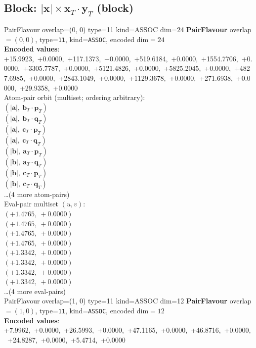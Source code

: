 \documentclass[a4paper,11pt]{article}
\newcommand{\vc}[1]{\ensuremath{\mathbf{#1}}}
\newcommand{\dnfagmiihhiejm}[1]{|\vc{#1}|}
\newcommand{\fpbeomcfokjooi}[2]{\mathbf{#1}_T \cdot \mathbf{#2}_T}
\begin{document}
\subsection{Block: $\dnfagmiihhiejm{x} \times \fpbeomcfokjooi{x}{y}$  (block)}
    PairFlavour  overlap=(0, 0)  type=11  kind=ASSOC  dim=24
\textbf{PairFlavour} overlap$=(0, 0)$, type=\texttt{11}, kind=\texttt{ASSOC}, encoded dim$=24$\\
\textbf{      Encoded values}: +15.9923,\ +0.0000,\ +117.1373,\ +0.0000,\ +519.6184,\ +0.0000,\ +1554.7706,\ +0.0000,\ +3305.7787,\ +0.0000,\ +5121.4826,\ +0.0000,\ +5825.2045,\ +0.0000,\ +4827.6985,\ +0.0000,\ +2843.1049,\ +0.0000,\ +1129.3678,\ +0.0000,\ +271.6938,\ +0.0000,\ +29.9358,\ +0.0000\\
\quad Atom-pair orbit (multiset; ordering arbitrary):\\
$(\dnfagmiihhiejm{a},\ \fpbeomcfokjooi{b}{p})$\\
$(\dnfagmiihhiejm{a},\ \fpbeomcfokjooi{b}{q})$\\
$(\dnfagmiihhiejm{a},\ \fpbeomcfokjooi{c}{p})$\\
$(\dnfagmiihhiejm{a},\ \fpbeomcfokjooi{c}{q})$\\
$(\dnfagmiihhiejm{b},\ \fpbeomcfokjooi{a}{p})$\\
$(\dnfagmiihhiejm{b},\ \fpbeomcfokjooi{a}{q})$\\
$(\dnfagmiihhiejm{b},\ \fpbeomcfokjooi{c}{p})$\\
$(\dnfagmiihhiejm{b},\ \fpbeomcfokjooi{c}{q})$\\
\quad \ldots (4 more atom-pairs)\\
\quad Eval-pair multiset $(u, v)$:\\
$(+1.4765,\ +0.0000)$\\
$(+1.4765,\ +0.0000)$\\
$(+1.4765,\ +0.0000)$\\
$(+1.4765,\ +0.0000)$\\
$(+1.3342,\ +0.0000)$\\
$(+1.3342,\ +0.0000)$\\
$(+1.3342,\ +0.0000)$\\
$(+1.3342,\ +0.0000)$\\
\quad \ldots (4 more eval-pairs)\\
    PairFlavour  overlap=(1, 0)  type=11  kind=ASSOC  dim=12
\textbf{PairFlavour} overlap$=(1, 0)$, type=\texttt{11}, kind=\texttt{ASSOC}, encoded dim$=12$\\
\textbf{      Encoded values}: +7.9962,\ +0.0000,\ +26.5993,\ +0.0000,\ +47.1165,\ +0.0000,\ +46.8716,\ +0.0000,\ +24.8287,\ +0.0000,\ +5.4714,\ +0.0000\\
\end{document}
